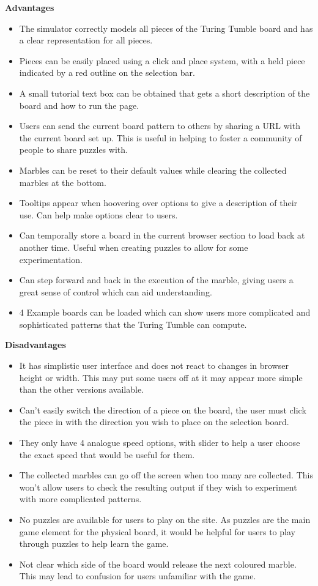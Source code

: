 \documentclass{l4proj}
\begin{document}
\textbf{Advantages}
\begin{itemize}
    \item The simulator correctly models all pieces of the Turing Tumble board and has a clear representation for all pieces.
    \item Pieces can be easily placed using a click and place system, with a held piece indicated by a red outline on the selection bar.
    \item A small tutorial text box can be obtained that gets a short description of the board and how to run the page.
    \item Users can send the current board pattern to others by sharing a URL with the current board set up. This is useful in helping to foster a community of people to share puzzles with.
    \item Marbles can be reset to their default values while clearing the collected marbles at the bottom.
    \item Tooltips appear when hoovering over options to give a description of their use. Can help make options clear to users.
    \item Can temporally store a board in the current browser section to load back at another time. Useful when creating puzzles to allow for some experimentation.
    \item Can step forward and back in the execution of the marble, giving users a great sense of control which can aid understanding.
    \item 4 Example boards can be loaded which can show users more complicated and sophisticated patterns that the Turing Tumble can compute. 
\end{itemize}

\textbf{Disadvantages}
\begin{itemize}
    \item It has simplistic user interface and does not react to changes in browser height or width. This may put some users off at it may appear more simple than the other versions available.
    \item Can't easily switch the direction of a piece on the board, the user must click the piece in with the direction you wish to place on the selection board.
    \item They only have 4 analogue speed options, with slider to help a user choose the exact speed that would be useful for them.
    \item The collected marbles can go off the screen when too many are collected. This won't allow users to check the resulting output if they wish to experiment with more complicated patterns.
    \item No puzzles are available for users to play on the site. As puzzles are the main game element for the physical board, it would be helpful for users to play through puzzles to help learn the game.
    \item Not clear which side of the board would release the next coloured marble. This may lead to confusion for users unfamiliar with the game.
\end{itemize}
\end{document}
